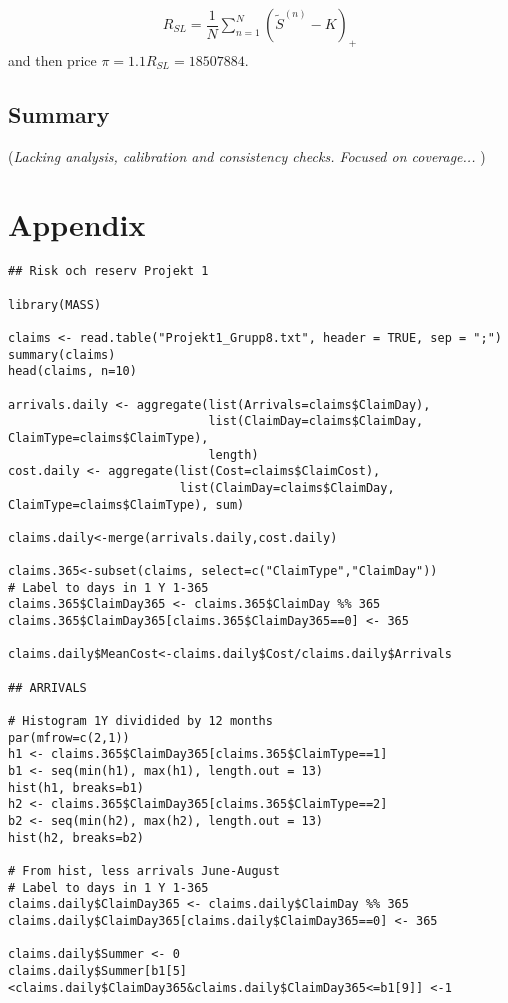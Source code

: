 \documentclass[11pt]{article}
\begin{document}
\begin{align} \label{eqsl1}
	R_{SL} = \dfrac{1}{N}\sum_{n=1}^N\left(	 \tilde{S}^{(n)}-K\right)_+        
\end{align}
and then price $\pi = 1.1R_{SL} = 18507884$.

\subsection*{Summary}
({\it Lacking analysis, calibration and consistency checks. Focused on coverage... })



\section*{Appendix}

\begin{verbatim}
## Risk och reserv Projekt 1

library(MASS)

claims <- read.table("Projekt1_Grupp8.txt", header = TRUE, sep = ";")
summary(claims)
head(claims, n=10)

arrivals.daily <- aggregate(list(Arrivals=claims$ClaimDay),
                            list(ClaimDay=claims$ClaimDay, ClaimType=claims$ClaimType),
                            length)
cost.daily <- aggregate(list(Cost=claims$ClaimCost),
                        list(ClaimDay=claims$ClaimDay, ClaimType=claims$ClaimType), sum)

claims.daily<-merge(arrivals.daily,cost.daily)

claims.365<-subset(claims, select=c("ClaimType","ClaimDay"))
# Label to days in 1 Y 1-365
claims.365$ClaimDay365 <- claims.365$ClaimDay %% 365
claims.365$ClaimDay365[claims.365$ClaimDay365==0] <- 365

claims.daily$MeanCost<-claims.daily$Cost/claims.daily$Arrivals

## ARRIVALS

# Histogram 1Y dividided by 12 months
par(mfrow=c(2,1))
h1 <- claims.365$ClaimDay365[claims.365$ClaimType==1]
b1 <- seq(min(h1), max(h1), length.out = 13)
hist(h1, breaks=b1)
h2 <- claims.365$ClaimDay365[claims.365$ClaimType==2]
b2 <- seq(min(h2), max(h2), length.out = 13)
hist(h2, breaks=b2)

# From hist, less arrivals June-August
# Label to days in 1 Y 1-365
claims.daily$ClaimDay365 <- claims.daily$ClaimDay %% 365
claims.daily$ClaimDay365[claims.daily$ClaimDay365==0] <- 365

claims.daily$Summer <- 0
claims.daily$Summer[b1[5]<claims.daily$ClaimDay365&claims.daily$ClaimDay365<=b1[9]] <-1


\end{verbatim}
\end{document}
